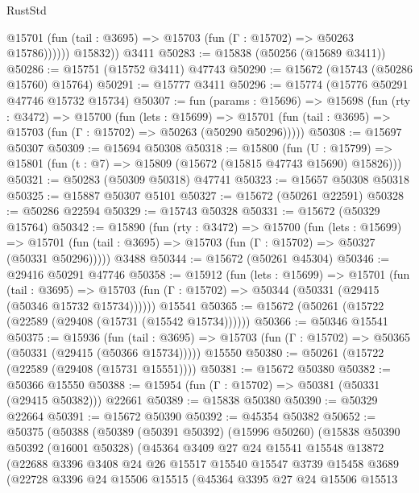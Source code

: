 \begin{lexlean}{RustStd}
\begin{coremodule}
              @15701 (fun (tail : @3695) => @15703 (fun (Γ : @15702) => @50263 @15786))))))
        @15832))
    @3411
@50283 := @15838 (@50256 (@15689 @3411))
@50286 := @15751 (@15752 @3411) @47743
@50290 := @15672 (@15743 (@50286 @15760) @15764)
@50291 := @15777 @3411
@50296 := @15774 (@15776 @50291 @47746 @15732 @15734)
@50307 := fun (params : @15696) =>
  @15698
    (fun (rty : @3472) =>
    @15700
      (fun (lets : @15699) =>
      @15701 (fun (tail : @3695) => @15703 (fun (Γ : @15702) => @50263 (@50290 @50296)))))
@50308 := @15697 @50307
@50309 := @15694 @50308
@50318 := @15800
    (fun (U : @15799) => @15801 (fun (t : @7) => @15809 (@15672 (@15815 @47743 @15690) @15826)))
@50321 := @50283 (@50309 @50318) @47741
@50323 := @15657 @50308 @50318
@50325 := @15887 @50307 @5101
@50327 := @15672 (@50261 @22591)
@50328 := @50286 @22594
@50329 := @15743 @50328
@50331 := @15672 (@50329 @15764)
@50342 := @15890
    (fun (rty : @3472) =>
    @15700
      (fun (lets : @15699) =>
      @15701 (fun (tail : @3695) => @15703 (fun (Γ : @15702) => @50327 (@50331 @50296)))))
    @3488
@50344 := @15672 (@50261 @45304)
@50346 := @29416 @50291 @47746
@50358 := @15912
    (fun (lets : @15699) =>
    @15701
      (fun (tail : @3695) =>
      @15703 (fun (Γ : @15702) => @50344 (@50331 (@29415 (@50346 @15732 @15734))))))
    @15541
@50365 := @15672 (@50261 (@15722 (@22589 (@29408 (@15731 (@15542 @15734))))))
@50366 := @50346 @15541
@50375 := @15936
    (fun (tail : @3695) => @15703 (fun (Γ : @15702) => @50365 (@50331 (@29415 (@50366 @15734)))))
    @15550
@50380 := @50261 (@15722 (@22589 (@29408 (@15731 @15551))))
@50381 := @15672 @50380
@50382 := @50366 @15550
@50388 := @15954 (fun (Γ : @15702) => @50381 (@50331 (@29415 @50382))) @22661
@50389 := @15838 @50380
@50390 := @50329 @22664
@50391 := @15672 @50390
@50392 := @45354 @50382
@50652 := @50375
    (@50388
      (@50389
        (@50391 @50392)
        (@15996 @50260)
        (@15838
          @50390
          @50392
          (@16001 @50328)
          (@45364
            @3409
            @27
            @24
            @15541
            @15548
            @13872
            (@22688
              @3396
              @3408
              @24
              @26
              @15517
              @15540
              @15547
              @3739
              @15458
              @3689
              (@22728
                @3396
                @24
                @15506
                @15515
                (@45364
                  @3395
                  @27
                  @24
                  @15506
                  @15513

\end{coremodule}
\end{lexlean}

